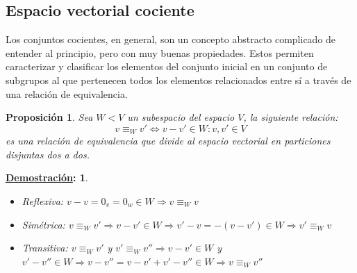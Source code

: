 \documentclass[10pt,a4paper,openright]{book}
\theoremstyle{break}
\newtheorem*{prop}{Proposición}
\newtheorem*{demo}{\underline{Demostración}:}
\begin{document}
\subsection{Espacio vectorial cociente}
Los conjuntos cocientes, en general, son un concepto abstracto complicado de entender al principio, pero con muy buenas propiedades. Estos permiten caracterizar y clasificar los elementos del conjunto inicial en un conjunto de subgrupos al que pertenecen todos los elementos relacionados entre sí a través de una relación de equivalencia.

\begin{prop}
Sea $W<V$ un subespacio del espacio $V$, la siguiente relación:
$$v\equiv_W v' \Leftrightarrow v-v'\in W: v,v'\in V$$
es una relación de equivalencia que divide al espacio vectorial en particiones disjuntas dos a dos.
\end{prop}
\begin{demo}
\begin{itemize}
\item Reflexiva: $v-v=0_v=0_w\in W\Rightarrow v\equiv_W v$
\item Simétrica: $v\equiv_W v'\Rightarrow v-v'\in W\Rightarrow v'-v=-(v-v')\in W\Rightarrow v'\equiv_W v$
\item Transitiva: $v\equiv_W v'$ y $v'\equiv_W v''\Rightarrow v-v'\in W$ y $v'-v''\in W\Rightarrow v-v''=v-v'+v'-v''\in W\Rightarrow v\equiv_W v''$
\end{itemize}
\end{demo}
\end{document}
